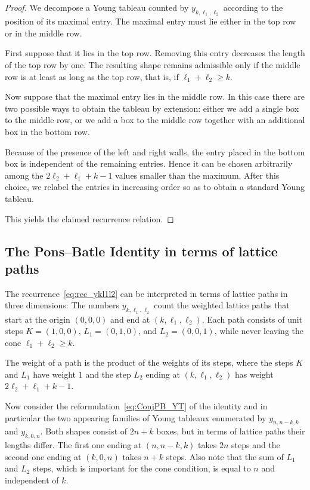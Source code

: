 \documentclass[a4paper,UKenglish,cleveref, autoref, thm-restate]{lipics-v2021}
\begin{document}
\begin{proof}
We decompose a Young tableau counted by $y_{k,\ell_1,\ell_2}$ according to the position of its maximal entry. 
The maximal entry must lie either in the top row or in the middle row.

First suppose that it lies in the top row. Removing this entry decreases the length of the top row by one. 
The resulting shape remains admissible only if the middle row is at least as long as the top row, that is, if $\ell_1 + \ell_2 \ge k$.

Now suppose that the maximal entry lies in the middle row. In this case there are two possible ways to obtain the tableau by extension: either we add a single box to the middle row, or we add a box to the middle row together with an additional box in the bottom row.

Because of the presence of the left and right walls, the entry placed in the bottom box is independent of the remaining entries. Hence it can be chosen arbitrarily among the $2\ell_2 + \ell_1 + k - 1$ values smaller than the maximum. After this choice, we relabel the entries in increasing order so as to obtain a standard Young tableau.

This yields the claimed recurrence relation.
\end{proof}

\subsection{The Pons--Batle Identity in terms of lattice paths}\label{sec:conjinlps}

The recurrence~\eqref{eq:rec_ykl1l2} can be interpreted in terms of lattice paths in three dimensions:
The numbers $y_{k,\ell_1,\ell_2}$ count the weighted lattice paths that start at the origin $(0,0,0)$ and end at $(k,\ell_1,\ell_2)$. 
Each path consists of unit steps $K=(1,0,0)$, $L_1=(0,1,0)$, and $L_2=(0,0,1)$, while never leaving the cone $\ell_1 + \ell_2 \ge k$.

The weight of a path is the product of the weights of its steps, where the steps $K$ and $L_1$ have weight $1$ and the step $L_2$ ending at $(k,\ell_1,\ell_2)$ has weight $2\ell_2 + \ell_1 + k-1$.

Now consider the reformulation~\eqref{eq:ConjPB_YT} of the identity and in particular the two appearing families of Young tableaux enumerated by $y_{n,n-k,k}$ and $y_{k,0,n}$.
Both shapes consist of $2n+k$ boxes, but in terms of lattice paths their lengths differ.
The first one ending at $(n,n-k,k)$ takes $2n$ steps and the second one ending at $(k,0,n)$ takes $n+k$ steps.
Also note that the sum of $L_1$ and $L_2$ steps, which is important for the cone condition, is equal to $n$ and independent of $k$. 
\end{document}
